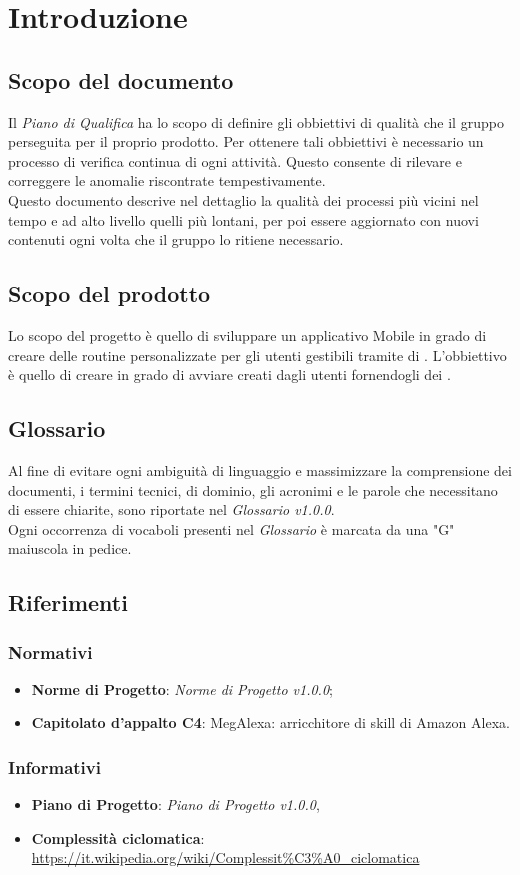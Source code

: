 \chapter{Introduzione}
\section{Scopo del documento}
Il \textit{Piano di Qualifica} ha lo scopo di definire gli obbiettivi di qualità che il gruppo perseguita per il proprio prodotto. Per ottenere tali obbiettivi è necessario un processo di verifica continua di ogni attività. Questo consente di rilevare e correggere le anomalie riscontrate tempestivamente.\\
Questo documento descrive nel dettaglio la qualità dei processi più vicini nel tempo e ad alto livello quelli più lontani, per poi essere aggiornato con nuovi contenuti ogni volta che il gruppo lo ritiene necessario.
\section{Scopo del prodotto}
Lo scopo del progetto è quello di sviluppare un applicativo Mobile in grado di creare delle routine personalizzate per gli utenti gestibili tramite  di . L'obbiettivo è quello di creare  in grado di avviare  creati dagli utenti fornendogli dei .
\section{Glossario}
Al fine di evitare ogni ambiguità di linguaggio e massimizzare la comprensione dei documenti, i termini tecnici, di dominio, gli acronimi e le parole che necessitano di essere chiarite, sono riportate nel \textit{Glossario v1.0.0}.\\
Ogni occorrenza di vocaboli presenti nel \textit{Glossario} è marcata da una "G" maiuscola in pedice.
\section{Riferimenti}
\subsection{Normativi}
\begin{itemize}
	\item  \textbf{Norme di Progetto}: \textit{Norme di Progetto v1.0.0};
	\item \textbf{Capitolato d'appalto C4}: MegAlexa: arricchitore di skill di Amazon Alexa.
\end{itemize}
\subsection{Informativi}
\begin{itemize}
	\item \textbf{Piano di Progetto}: \textit{Piano di Progetto v1.0.0},
	\item \textbf{Complessità ciclomatica}: \url{https://it.wikipedia.org/wiki/Complessit\%C3\%A0_ciclomatica}
\end{itemize}
